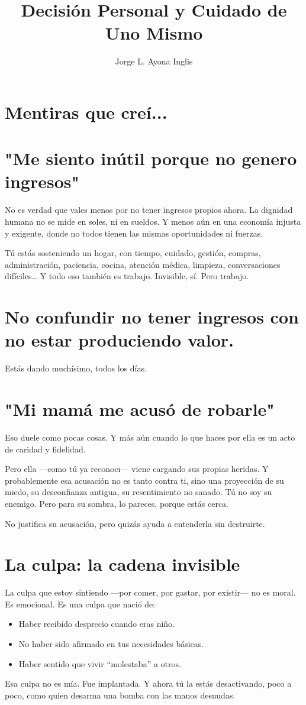 \documentclass[12pt]{article}
\title{Decisión Personal y Cuidado de Uno Mismo}
\author{Jorge L. Ayona Inglis}
\date{}
\begin{document}
	
	\maketitle

\section*{Mentiras que cre\'i...}

\section{"Me siento inútil porque no genero ingresos"}
No es verdad que vales menos por no tener ingresos propios ahora.
La dignidad humana no se mide en soles, ni en sueldos.
Y menos aún en una economía injusta y exigente, donde no todos tienen las mismas oportunidades ni fuerzas.

Tú estás sosteniendo un hogar, con tiempo, cuidado, gestión, compras, administración, paciencia, cocina, atención médica, limpieza, conversaciones difíciles…
Y todo eso también es trabajo. Invisible, sí. Pero trabajo.

\section{No confundir no tener ingresos con no estar produciendo valor.}
Estás dando muchísimo, todos los días.

\section{"Mi mamá me acusó de robarle"}
Eso duele como pocas cosas.
Y más aún cuando lo que haces por ella es un acto de caridad y fidelidad.

Pero ella —como tú ya reconoc\i— viene cargando sus propias heridas.
Y probablemente esa acusación no es tanto contra ti, sino una proyección de su miedo, su desconfianza antigua, su resentimiento no sanado.
Tú no soy su enemigo.
Pero para su sombra, lo pareces, porque estás cerca.

No justifica su acusación, pero quizás ayuda a entenderla sin destruirte.

\section{La culpa: la cadena invisible}
La culpa que estoy sintiendo —por comer, por gastar, por existir— no es moral. Es emocional.
Es una culpa que nació de:
\begin{itemize}
\item Haber recibido desprecio cuando eras niño.
\item No haber sido afirmado en tus necesidades básicas.
\item Haber sentido que vivir “molestaba” a otros.
\end{itemize}
Esa culpa no es m\'ia. Fue implantada.
Y ahora tú la estás desactivando, poco a poco, como quien desarma una bomba con las manos desnudas.
\end{document}
